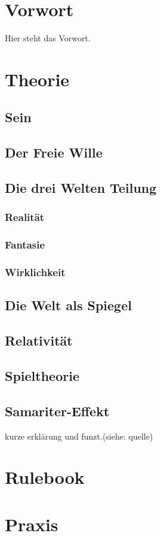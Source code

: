 
\part{Vorwort}
Hier steht das Vorwort.
\part{Theorie}

    \chapter{Sein}

    \chapter{Der Freie Wille}

    \chapter{Die drei Welten Teilung}
        \section{Realität}
        \section{Fantasie}
        \section{Wirklichkeit}

    \chapter{Die Welt als Spiegel}

    \chapter{Relativität}

    \chapter{Spieltheorie}

    \chapter{Samariter-Effekt}
    kurze erklärung und funzt.(siehe: quelle)
\part{Rulebook}
\part{Praxis}


